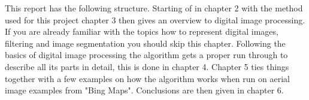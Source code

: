 This report has the following structure. Starting of in chapter 2 with the method
used for this project chapter 3 then gives an overview to digital
image processing. If you are already familiar with the topics how to represent
digital images, filtering and image segmentation you should skip this chapter.
Following the basics of digital image processing the algorithm gets a proper
run through to describe all its parts in detail, this is done in chapter 4.
Chapter 5 ties things together with a few examples on how the algorithm works
when run on aerial image examples from "Bing Maps". Conclusions are then given
in chapter 6.

%
%

